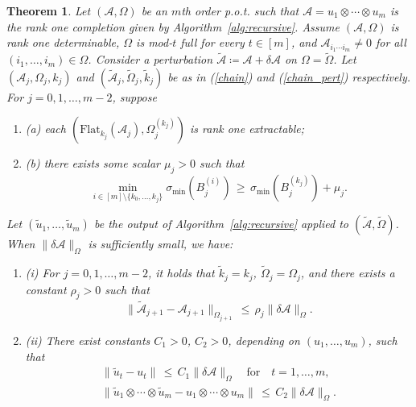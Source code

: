 \documentclass{amsart}
\newcommand{\dt}{\delta}
\newcommand{\tomg}{\widetilde{\Omega}}
\newcommand{\tu}{\tilde{u}}
\newcommand{\tk}{\tilde{k}}
\newcommand{\sig}{\sigma}
\newcommand{\reff}[1]{(\ref{#1})}
\newcommand{\mc}[1]{\mathcal{#1}}
\newcommand{\ddd}{,\ldots,}
\newcommand{\Flat}{\mbox{Flat}}
\newcommand{\bnum}{\begin{enumerate}}
\newcommand{\enum}{\end{enumerate}}
\newcommand{\be}{\begin{equation}}
\newcommand{\ee}{\end{equation}}
\newtheorem{theorem}{Theorem}[section]
\theoremstyle{definition}
\numberwithin{equation}{section}
\begin{document}
\begin{theorem}\label{thm:tensor_perturb}
Let $(\mc{A}, \Omega)$ be an $m$th order p.o.t. such that
$
\mc{A} = u_1 \otimes \cdots \otimes u_m
$
is the rank one completion given by Algorithm~\ref{alg:recursive}.
Assume $(\mc{A}, \Omega)$ is rank one determinable,
$\Omega$ is mod-$t$ full for every $t \in [m]$, and 
$\mc{A}_{i_1 \cdots i_m} \ne 0$ for all $(i_1 \ddd i_m) \in \Omega$.
Consider a perturbation $\widetilde{\mc{A}} \coloneqq \mc{A} + \dt \mc{A}$ on $\Omega = \tomg$.
Let $(\mc{A}_j,\Omega_j, k_j)$ and $(\widetilde{\mc{A}}_j,\tomg_j, \tk_j)$
be as in \reff{chain} and \reff{chain_pert} respectively.
For $j = 0,1 \ddd m-2$, suppose
\bnum
\item[(a)] each $(\Flat_{k_j}(\mc{A}_j), \Omega_j^{(k_j)})$ is rank one extractable;

\item[(b)] there exists some scalar $\mu_j > 0$ such that
\[
\min_{i \in [m] \setminus \{ k_0 \ddd k_{j} \}} \sig_{\min}(B_j^{(i)}) \,\ge\, \sig_{\min}(B_j^{(k_j)}) + \mu_j.
\]
\enum
Let $(\tu_1 \ddd \tu_m)$ be the output of Algorithm~\ref{alg:recursive} 
applied to $(\widetilde{\mc{A}}, \tomg)$.
When $\|\dt \mc{A}\|_{\Omega}$ is sufficiently small, we have:
\bnum
\item[(i)] For $j = 0,1 \ddd m-2$, it holds that
$\tk_j = k_j$, $\tomg_j = \Omega_j$, and there exists a constant $\rho_j > 0$ such that
\be\label{tA-A<=dA}
\| \widetilde{\mc{A}}_{j+1} - \mc{A}_{j+1} \|_{\Omega_{j+1}} \,\le\, \rho_j \|\dt \mc{A}\|_{\Omega}.
\ee

\item[(ii)] There exist constants $C_1>0$, $C_2 > 0$, depending on $(u_1 \ddd u_m)$, such that
\begin{gather}
\label{tu_i-u_i<=dA}
\| \tu_t - u_t \| \,\le\, C_1 \|\dt \mc{A}\|_{\Omega} \quad \text{for} \quad t = 1 \ddd m, \\
\label{tu-u<=dA}
\| \tu_1 \otimes \cdots \otimes \tu_m - u_1 \otimes \cdots \otimes u_m \| \,\le\, C_2 \|\dt \mc{A}\|_{\Omega}.
\end{gather}
\enum
\end{theorem}
\end{document}
